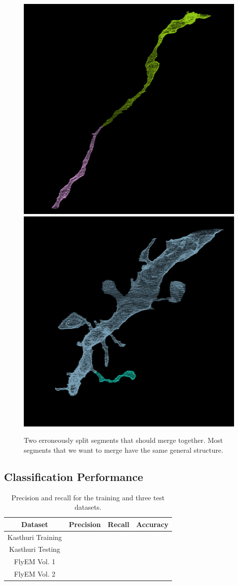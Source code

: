 \begin{figure}[t]
	\centering
	\includegraphics[width=0.42\linewidth]{./figures/merge_candidate1.png}
	\hspace{0.085\linewidth}
	\includegraphics[width=0.42\linewidth]{./figures/merge_candidate2.png}
	\caption{Two erroneously split segments that should merge together. Most segments that we want to merge have the same general structure.}
	\label{fig:skeleton-results}
\end{figure}


\subsection{Classification Performance}

\begin{table}
	\centering
	\begin{tabular}{c c c c} \hline
	\textbf{Dataset} & \textbf{Precision} & \textbf{Recall} & \textbf{Accuracy} \\ \hline
	Kasthuri Training & & & \\
	Kasthuri Testing & & & \\
	FlyEM Vol. 1 & & & \\
	FlyEM Vol. 2 & & & \\ \hline
	\end{tabular}
	\caption{Precision and recall for the training and three test datasets.}
	\label{fig:classification}
\end{table}

